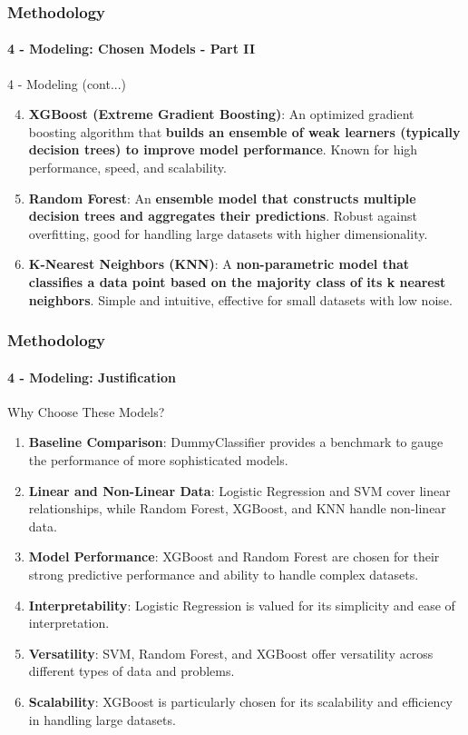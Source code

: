 \begin{frame}
	\frametitle{Methodology}
	\framesubtitle{4 - Modeling: Chosen Models - Part II}	
	\begin{block}{4 - Modeling (cont...)} 
		\begin{enumerate}
			\setcounter{enumi}{3}
			\item \textbf{XGBoost (Extreme Gradient Boosting)}: An optimized gradient boosting algorithm that \textbf{builds an ensemble of weak learners (typically decision trees) to improve model performance}. Known for high performance, speed, and scalability.
			
			\item \textbf{Random Forest}: An \textbf{ensemble model that constructs multiple decision trees and aggregates their predictions}. Robust against overfitting, good for handling large datasets with higher dimensionality.
			
			\item \textbf{K-Nearest Neighbors (KNN)}: A \textbf{non-parametric model that classifies a data point based on the majority class of its k nearest neighbors}. Simple and intuitive, effective for small datasets with low noise.
		\end{enumerate}
	\end{block}
\end{frame}
\begin{frame}
	\frametitle{Methodology}
	\framesubtitle{4 - Modeling: Justification}	
	\begin{alertblock}{Why Choose These Models?} 
		\begin{enumerate}
			\scriptsize
			\item \textbf{Baseline Comparison}: DummyClassifier provides a benchmark to gauge the performance of more sophisticated models.

			\item \textbf{Linear and Non-Linear Data}: Logistic Regression and SVM cover linear relationships, while Random Forest, XGBoost, and KNN handle non-linear data.

			\item \textbf{Model Performance}: XGBoost and Random Forest are chosen for their strong predictive performance and ability to handle complex datasets.

			\item \textbf{Interpretability}: Logistic Regression is valued for its simplicity and ease of interpretation.

			\item \textbf{Versatility}: SVM, Random Forest, and XGBoost offer versatility across different types of data and problems.

			\item \textbf{Scalability}: XGBoost is particularly chosen for its scalability and efficiency in handling large datasets.




		\end{enumerate}
	\end{alertblock}
\end{frame}



